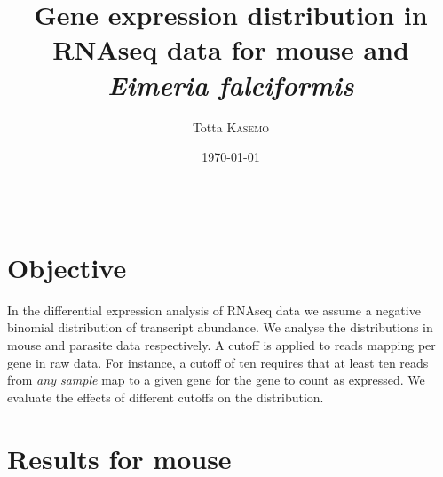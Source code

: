 \documentclass{article}
\title{Gene expression distribution in RNAseq data for mouse and \textit{Eimeria falciformis}} %
\author{Totta \textsc{Kasemo}} %
\date{\today} %
\begin{document}
\maketitle %

\begin{center}
\begin{tabular}{l r}
\end{tabular}
\end{center}



\section{Objective}

In the differential expression analysis of RNAseq data we assume a
negative binomial distribution of transcript abundance. We analyse the
distributions in mouse and parasite data respectively. A cutoff is
applied to reads mapping per gene in raw data. For instance, a cutoff
of ten requires that at least ten reads from \textit{any sample} map
to a given gene for the gene to count as expressed. We evaluate the
effects of different cutoffs on the distribution.



\section{Results for mouse}
\end{document}
